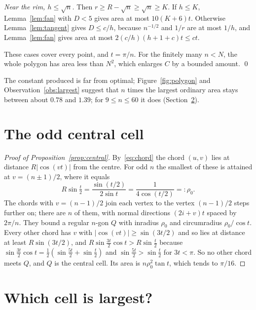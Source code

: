 \documentclass[11pt]{amsart}
\theoremstyle{remark}
\begin{document}
\emph{Near the rim, $h\le\sqrt n$.} Then $r\ge R-\sqrt n\ge\sqrt n\ge K$. If $h\le K$, Lemma~\ref{lem:fan} with $D<5$ gives area at most $10(K+6)t$. Otherwise Lemma~\ref{lem:tangent} gives $D\le c/h$, because $n^{-1/2}$ and $1/r$ are at most $1/h$, and Lemma~\ref{lem:fan} gives area at most $2(c/h)(h+1+c)t\le ct$.

These cases cover every point, and $t=\pi/n$. For the finitely many $n<N$, the whole polygon has area less than $N^2$, which enlarges $C$ by a bounded amount. \qed

The constant produced is far from optimal; Figure~\ref{fig:polygon} and Observation~\ref{obs:largest} suggest that $n$ times the largest ordinary area stays between about $0.78$ and $1.39$; for $9\le n\le60$ it does (Section~\ref{sec:largest}).

\section{The odd central cell}

\begin{proof}[Proof of Proposition~\ref{prop:central}]
By~\eqref{eq:chord} the chord $(u,v)$ lies at distance $R|\cos(vt)|$ from the centre. For odd $n$ the smallest of these is attained at $v=(n\pm1)/2$, where it equals
\[
R\sin\tfrac t2=\frac{\sin(t/2)}{2\sin t}=\frac1{4\cos(t/2)}=:\rho_0 .
\]
The chords with $v=(n-1)/2$ join each vertex to the vertex $(n-1)/2$ steps further on; there are $n$ of them, with normal directions $(2i+v)t$ spaced by $2\pi/n$. They bound a regular $n$-gon $Q$ with inradius $\rho_0$ and circumradius $\rho_0/\cos t$. Every other chord has $v$ with $|\cos(vt)|\ge\sin(3t/2)$ and so lies at distance at least $R\sin(3t/2)$, and $R\sin\frac{3t}2\cos t>R\sin\frac t2$ because $\sin\frac{3t}2\cos t=\frac12(\sin\frac{5t}2+\sin\frac t2)$ and $\sin\frac{5t}2>\sin\frac t2$ for $3t<\pi$. So no other chord meets $Q$, and $Q$ is the central cell. Its area is $n\rho_0^2\tan t$, which tends to $\pi/16$.
\end{proof}

\section{Which cell is largest?}\label{sec:largest}
\end{document}
